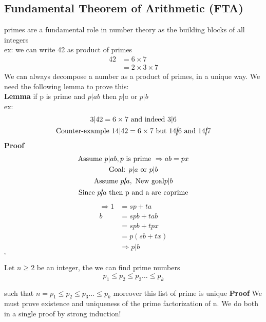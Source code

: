 \documentclass{article}
\begin{document}
\subsection{Fundamental Theorem of Arithmetic (FTA)}
primes are a fundamental role in number theory as the building blocks of all integers
\\ex: we can write 42 as product of primes
\begin{align*}
    42 & =6 \times 7 \\&= 2 \times 3 \times 7
\end{align*}
We can always decompose a number as a product of primes, in a unique way. We need the following lemma to prove this: \\
\textbf{Lemma} if p is prime and $p|ab$ then $p|a$ or $p|b$\\
ex:
\begin{gather*}
    3 | 42 = 6 \times 7 \text{ and indeed } 3 | 6 \\
    \text{Counter-example } 14 | 42 = 6 \times 7 \text{ but } 14 \cancel{\lvert} 6 \text{ and } 14 \cancel{\lvert} 7
\end{gather*}
\textbf{Proof}
\begin{gather*}
    \text{Assume } p | ab, p \text{ is prime } \Rightarrow ab=px \\
    \text{Goal: } p|a \text{ or } p|b \\
    \text{Assume } p \cancel{|} a, \text{ New goal} p | b \\
    \text{Since } p \cancel{|} a \text{ then p and a are coprime}
\end{gather*}
\begin{align*}
    \Rightarrow  1 & = sp+ta         \\
    b              & = spb + tab     \\
                   & = spb+tpx       \\
                   & = p(sb+tx)      \\
                   & \Rightarrow p|b
\end{align*}
\hspace*{\fill} $\square$

Let $n \ge 2$ be an integer, the we can find prime numbers \[
    p_1 \le p_2 \le p_3 \dots \le p_k
\]

such that $
    n =    p_1 \le p_2 \le p_3 \dots \le p_k
$
moreover this list of prime is unique
\textbf{Proof} We must prove existence and uniqueness of the prime factorization of n. We do both in a single proof by strong induction!
\end{document}
